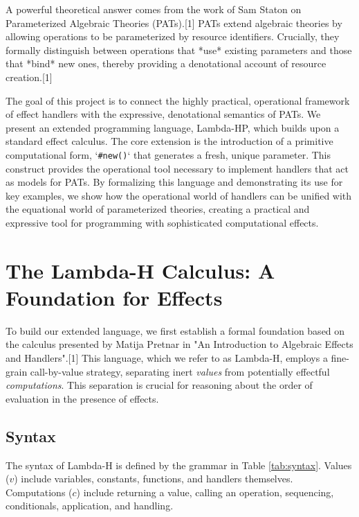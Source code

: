 \documentclass{article}
\begin{document}
A powerful theoretical answer comes from the work of Sam Staton on Parameterized Algebraic Theories (PATs).[1] PATs extend algebraic theories by allowing operations to be parameterized by resource identifiers. Crucially, they formally distinguish between operations that *use* existing parameters and those that *bind* new ones, thereby providing a denotational account of resource creation.[1]

The goal of this project is to connect the highly practical, operational framework of effect handlers with the expressive, denotational semantics of PATs. We present an extended programming language, Lambda-HP, which builds upon a standard effect calculus. The core extension is the introduction of a primitive computational form, `\texttt{\#new()}` that generates a fresh, unique parameter. This construct provides the operational tool necessary to implement handlers that act as models for PATs. By formalizing this language and demonstrating its use for key examples, we show how the operational world of handlers can be unified with the equational world of parameterized theories, creating a practical and expressive tool for programming with sophisticated computational effects.

\section{The Lambda-H Calculus: A Foundation for Effects}
To build our extended language, we first establish a formal foundation based on the calculus presented by Matija Pretnar in "An Introduction to Algebraic Effects and Handlers".[1] This language, which we refer to as Lambda-H, employs a fine-grain call-by-value strategy, separating inert \emph{values} from potentially effectful \emph{computations}. This separation is crucial for reasoning about the order of evaluation in the presence of effects.

\subsection{Syntax}
The syntax of Lambda-H is defined by the grammar in Table \ref{tab:syntax}. Values ($v$) include variables, constants, functions, and handlers themselves. Computations ($c$) include returning a value, calling an operation, sequencing, conditionals, application, and handling.
\end{document}
